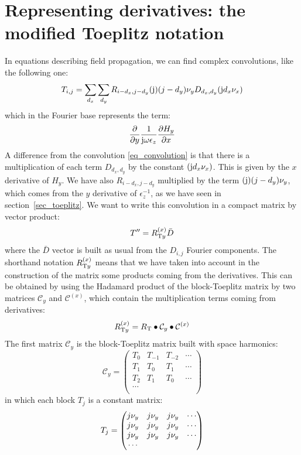 \section[The modified Toeplitz notation]{Representing derivatives: the modified Toeplitz notation}
\label{sec_derivatives}
In equations describing field propagation, we can find complex convolutions, like the following one:
\begin{equation}
T_{i,j}=\sum_{d_x}\sum_{d_y}R_{i-d_x,j-d_y}(\mathrm{j})(j-d_y)\nu_y D_{d_x,d_y}(\mathrm{j} d_x\nu_x)
\end{equation}
which in the Fourier base represents the term:
\begin{equation}
\frac{\partial}{\partial y}\frac{1}{\mathrm{j} \omega\epsilon_z} \frac{\partial H_y}{\partial x}
\end{equation}
A difference from the convolution \eqref{eq_convolution} is that there is a multiplication of each term $D_{d_x,d_y}$ by the constant $(\mathrm{j} d_x\nu_x)$. This is given by the $x$ derivative of $H_y$. We have also  $R_{i-d_x,j-d_y}$ multiplied by the term $(\mathrm{j})(j-d_y)\nu_y$, which comes from the $y$ derivative of $\epsilon_z^{-1}$, as we have seen in section~\ref{sec_toeplitz}.
We want to write this convolution in a compact matrix by vector product:
\begin{equation}
T''=R_{\mathrm{T} y}^{(x)} \bar{D}
\end{equation}
where the $\bar{D}$ vector is built as usual from the $D_{i,j}$ Fourier components.
The shorthand notation $R_{\mathrm{T} y}^{(x)}$ means that we have taken into account in the construction of the matrix some products coming from the derivatives. This can be obtained by using the Hadamard product of the block-Toeplitz matrix by two matrices $\mathcal{C}_y$ and $\mathcal{C}^{(x)}$, which contain the multiplication terms coming from derivatives:
\begin{equation}
R_{\mathrm{T} y}^{(x)}=R_{\mathrm{T}} \bullet \mathcal{C}_y \bullet \mathcal{C}^{(x)}
\end{equation}
The first matrix $\mathcal{C}_y$ is the block-Toeplitz matrix built with space harmonics:
\begin{equation}
\mathcal{C}_y=
\begin{pmatrix}
	T_{0} & T_{-1} & T_{-2} & \cdots \\
	T_{1} & T_{0} & T_{1} & \cdots \\
	T_{2} & T_{1} & T_{0} & \cdots \\
\cdots\\
\end{pmatrix}
\end{equation}
in which each block $T_j$ is a constant matrix:
\begin{equation}
T_j=
\begin{pmatrix}
j\nu_y & j\nu_y & j\nu_y & \cdots \\
j\nu_y & j\nu_y & j\nu_y & \cdots \\
j\nu_y & j\nu_y & j\nu_y & \cdots \\
\cdots\\
\end{pmatrix}
\end{equation}

